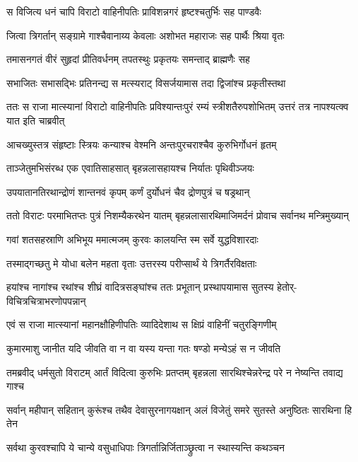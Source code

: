 \twolineshloka
{स विजित्य धनं चापि विराटो वाहिनीपतिः}
{प्राविशन्नगरं हृष्टश्चतुर्भिः सह पाण्डवैः}


\twolineshloka
{जित्वा त्रिगर्तान् सङ्ग्रामे गाश्चैवानाय्य केवलाः}
{अशोभत महाराजः सह पार्थैः श्रिया वृतः}


\twolineshloka
{तमासनगतं वीरं सुहृदां प्रीतिवर्धनम्}
{तपतस्थुः प्रकृतयः समन्ताद् ब्राह्मणैः सह}


\twolineshloka
{सभाजितः सभासद्भिः प्रतिनन्द्य स मत्स्यराट्}
{विसर्जयामास तदा द्विजांश्च प्रकृतीस्तथा}


\threelineshloka
{ततः स राजा मात्स्यानां विराटो वाहिनीपतिः}
{प्रविश्यान्तःपुरं रम्यं स्त्रीशतैरुपशोभितम्}
{उत्तरं तत्र नापश्यत्क्व यात इति चाब्रवीत्}


\twolineshloka
{आचख्युस्तत्र संहृष्टाः स्त्रियः कन्याश्च वेश्मनि}
{अन्तःपुरचराश्चैव कुरुभिर्गोधनं हृतम्}


\twolineshloka
{ताञ्जेतुमभिसंरब्ध एक एवातिसाहसात्}
{बृहन्नलासहायश्च निर्यातः पृथिवीञ्जयः}


\twolineshloka
{उपयातानतिरथान्द्रोणं शान्तनवं कृपम्}
{कर्णं दुर्योधनं चैव द्रोणपुत्रं च षड्रथान्}


\fourlineindentedshloka
{ततो विराटः परमाभितप्तः}
{पुत्रं निशम्यैकरथेन यातम्}
{बृहन्नलासारथिमाजिमर्दनं}
{प्रोवाच सर्वानथ मन्त्रिमुख्यान्}


\twolineshloka
{गवां शतसहस्राणि अभिभूय ममात्मजम्}
{कुरवः कालयन्ति स्म सर्वे युद्धविशारदाः}


\twolineshloka
{तस्माद्गच्छतु मे योधा बलेन महता वृताः}
{उत्तरस्य परीप्सार्थं ये त्रिगर्तैरविक्षताः}



\fourlineindentedshloka
{हयांश्च नागांश्च रथांश्च शीघ्रं}
{वादित्रसङ्घांश्च ततः प्रभूतान्}
{प्रस्थापयामास सुतस्य हेतोर्-}
{विचित्रचित्राभरणोपपन्नान्}


\twolineshloka
{एवं स राजा मात्स्यानां महानक्षौहिणीपतिः}
{व्यादिदेशाथ स क्षिप्रं वाहिनीं चतुरङ्गिणीम्}


\twolineshloka
{कुमारमाशु जानीत यदि जीवति वा न वा}
{यस्य यन्ता गतः षण्डो मन्येऽहं स न जीवति}


\fourlineindentedshloka
{तमब्रवीद्  धर्मसुतो विराटम्}
{आर्तं विदित्वा कुरुभिः प्रतप्तम्}
{बृहन्नला सारथिश्चेन्नरेन्द्र}
{परे न नेष्यन्ति तवाद्य गाश्च}


\fourlineindentedshloka
{सर्वान् महीपान् सहितान् कुरूंश्च}
{तथैव देवासुरनागयक्षान्}
{अलं विजेतुं समरे सुतस्ते}
{अनुष्ठितः सारथिना हि तेन}


\twolineshloka
{सर्वथा कुरवश्चापि ये चान्ये वसुधाधिपाः}
{त्रिगर्तान्निर्जिताञ्छ्रुत्वा न स्थास्यन्ति कथञ्चन}


